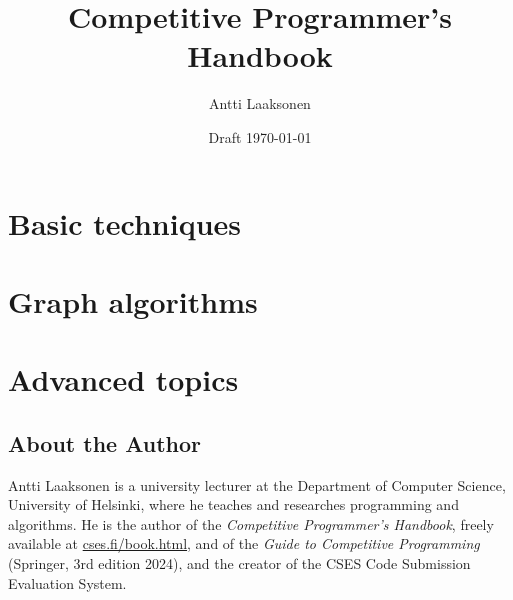 \documentclass[twoside,10pt,english]{book}
\date{Draft \today}
\title{\sffamily\Huge Competitive Programmer's Handbook}
\author{\Large Antti Laaksonen}
\makeatletter
\renewcommand{\RaggedRight}{%
  \if@raggedtwoe@localhook
    \let\@raggedtwoe@everyselectfont\@raggedtwoe@everyselectfont@active%
  \fi
  \let\\\@raggedtwoe@savedcr
  \let\@gnewline\@raggedtwoe@saved@gnewline
  \leftskip\RaggedRightLeftskip
  \@rightskip\RaggedRightRightskip
  \rightskip\@rightskip
  \parfillskip\RaggedRightParfillskip
  \parindent\RaggedRightParindent
  \@raggedtwoe@spaceskiptrue
  \@raggedtwoe@everyselectfont
  }
\makeatother
\begin{document}
\RaggedRight



\frontmatter
\setcounter{tocdepth}{1}


\hypersetup{linkcolor=black}
\tableofcontents
\hypersetup{linkcolor=linkorange}

\mainmatter
{}
\setcounter{page}{1}

\newcommand{\key}[1] {\textbf{#1}}

\part{Basic techniques}










\part{Graph algorithms}










\part{Advanced topics}











\cleardoublepage
{}
{}


\cleardoublepage
\printindex

\cleardoublepage
{}
{}
\chapter*{About the Author}

Antti Laaksonen is a university lecturer at the Department of Computer
Science, University of Helsinki, where he teaches and researches programming
and algorithms. He is the author of the \emph{Competitive Programmer's
Handbook}, freely available at \href{https://cses.fi/book.html}{cses.fi/book.html},
and of the \emph{Guide to Competitive Programming} (Springer, 3rd edition
2024), and the creator of the CSES Code Submission Evaluation System.
\end{document}
